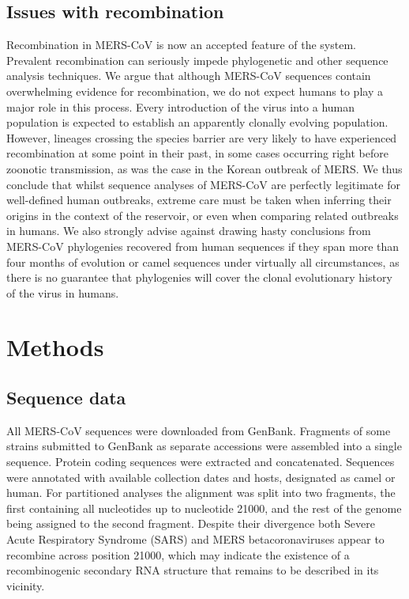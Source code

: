 \documentclass[11pt,oneside,letterpaper]{article}
\begin{document}
\subsection*{Issues with recombination}
Recombination in MERS-CoV is now an accepted feature of the system.
Prevalent recombination can seriously impede phylogenetic and other sequence analysis techniques.
We argue that although MERS-CoV sequences contain overwhelming evidence for recombination, we do not expect humans to play a major role in this process.
Every introduction of the virus into a human population is expected to establish an apparently clonally evolving population.
However, lineages crossing the species barrier are very likely to have experienced recombination at some point in their past, in some cases occurring right before zoonotic transmission, as was the case in the Korean outbreak of MERS.
We thus conclude that whilst sequence analyses of MERS-CoV are perfectly legitimate for well-defined human outbreaks, extreme care must be taken when inferring their origins in the context of the reservoir, or even when comparing related outbreaks in humans.
We also strongly advise against drawing hasty conclusions from MERS-CoV phylogenies recovered from human sequences if they span more than four months of evolution or camel sequences under virtually all circumstances, as there is no guarantee that phylogenies will cover the clonal evolutionary history of the virus in humans.


\newpage

\section*{Methods}
\subsection*{Sequence data}
All MERS-CoV sequences were downloaded from GenBank.
Fragments of some strains submitted to GenBank as separate accessions were assembled into a single sequence.
Protein coding sequences were extracted and concatenated.
Sequences were annotated with available collection dates and hosts, designated as camel or human.
For partitioned analyses the alignment was split into two fragments, the first containing all nucleotides up to nucleotide 21000, and the rest of the genome being assigned to the second fragment.
Despite their divergence both Severe Acute Respiratory Syndrome (SARS) and MERS betacoronaviruses appear to recombine across position 21000, which may indicate the existence of a recombinogenic secondary RNA structure that remains to be described in its vicinity. %
\end{document}
